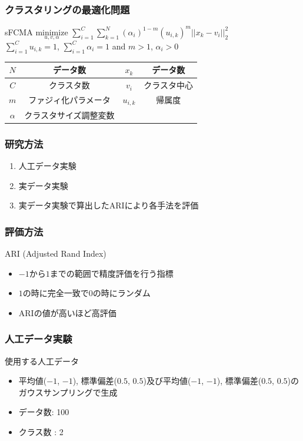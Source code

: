 \documentclass[13pt,dvipdfmx]{beamer}
\begin{document}
\begin{frame}\frametitle{クラスタリングの最適化問題}
  \begin{block}{sFCMA}
    \quad$\underset{u,v,\alpha}{\text{minimize}}$
    $\sum_{i=1}^C\sum_{k=1}^N(\alpha_{i})^{1-m}(u_{i,k})^m||x_k-v_i||_2^2$\\
    \qquad\qquad{}$\sum_{i=1}^Cu_{i,k}=1$\;, \;$\sum_{i=1}^C\alpha_{i}=1$\; and \;$m>1$\;, \;$\alpha_{i}>0$
  \end{block}
  \begin{center}
    \begin{tabular}{c|c||c|c} \hline
	  {$N$}&データ数&{$x_k$}&データ数 \\ \hline
	  {$C$}&クラスタ数&{$v_i$}&クラスタ中心\\ \hline
	  {$m$}&ファジィ化パラメータ&{$u_{i,k}$}&帰属度 \\ \hline
	  {$\alpha$}&クラスタサイズ調整変数\\ \hline
    \end{tabular}
  \end{center}
\end{frame}

\begin{frame}\frametitle{研究方法}
  \begin{enumerate}
  \item 人工データ実験
  \item 実データ実験
  \item 実データ実験で算出したARIにより各手法を評価
  \end{enumerate}
\end{frame}

\begin{frame}\frametitle{評価方法}
  \begin{block}{ARI (Adjusted Rand Index)}
    \begin{itemize}
    \item $-1$から$1$までの範囲で精度評価を行う指標
    \item $1$の時に完全一致で$0$の時にランダム
    \item ARIの値が高いほど高評価
    \end{itemize}
  \end{block}
  \begin{center}
  \end{center}
\end{frame}

\begin{frame}\frametitle{人工データ実験}
  \begin{block}{使用する人工データ}
    \begin{itemize}
    \item 平均値($-1$, $-1$), 標準偏差($0.5$, $0.5$)及び平均値($-1$, $-1$), 標準偏差($0.5$, $0.5$)のガウスサンプリングで生成
    \item データ数: 100
    \item クラス数 : 2
    \end{itemize}
  \end{block}
\end{frame}
\end{document}
